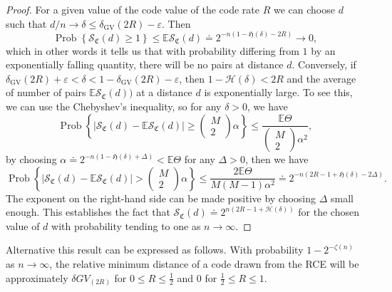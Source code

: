\begin{proof}
For a given value of the code value of the code rate $R$ we can choose $d$ such that $d/n\to\delta \leq \delta_{\mathrm{GV}}(2 R)-\varepsilon$. Then
\begin{equation}
\operatorname{Prob}\left\{\mathcal{S}_{\mathfrak{C}}(d) \geq 1\right\} \leq \mathbb{E} \mathcal{S}_{\mathfrak{C}}(d) \doteq 2^{-n(1-\mathfrak{H}(\delta)-2 R)} \rightarrow 0,
\end{equation}
which in other words it tells us that with probability differing from $1$ by an exponentially falling quantity, there will be no pairs at distance $d$. Conversely, if $\delta_{\mathrm{GV}}(2 R)+\varepsilon<\delta<1-\delta_{\mathrm{GV}}(2 R)-\varepsilon$, then $1-\mathcal{H}(\delta)<2R$ and the average of number of pairs $\mathbb{E} \mathcal{S}_{\mathfrak{C}}(d))$ at a distance $d$ is exponentially large. To see this, we can use the Chebyshev's inequality, so for any $\delta>0$, we have 
\begin{equation}
\operatorname{Prob}\left\{\left|\mathcal{S}_{\mathfrak{C}}(d)-\mathbb{E} \mathcal{S}_{\mathfrak{C}}(d)\right| \geq\left(\begin{array}{c}
M \\
2
\end{array}\right) \alpha\right\} \leq \frac{\mathbb{E} \Theta}{\left(\begin{array}{c}
M \\
2
\end{array}\right) \alpha^{2}},
\end{equation}
by choosing $\alpha \doteq 2^{-n(1-\mathfrak{H}(\delta)+\Delta)}<\mathbb{E} \Theta$ for any $\Delta>0$, then we have
\begin{equation}
\operatorname{Prob}\left\{\left|\mathcal{S}_{\mathfrak{C}}(d)-\mathbb{E}\mathcal{S}_{\mathfrak{C}}(d)\right|>\left(\begin{array}{c}
M \\
2
\end{array}\right) \alpha\right\}\leq \frac{2 \mathbb{E} \Theta}{M(M-1) \alpha^{2}} \doteq 2^{-n(2 R-1+\mathfrak{H}(\delta)-2 \Delta)}.
\label{CH2:probability_result}
\end{equation}
The exponent on the right-hand side can be made positive by choosing $\Delta$ small enough. This establishes the fact that $\mathcal{S}_{\mathfrak{C}}(d)\doteq 2^{n(2 R-1+\mathcal{H}(\delta))}$ for the chosen value of $d$ with probability tending to one as $n\to\infty$.
\end{proof}
Alternative this result can be expressed as follows. With probability $1-2^{-\zeta(n)}$ as $n\to \infty$, the relative minimum distance of a code drawn from the RCE will be approximately $\delta{GV}_(2R)$ for $0\leq R \leq \frac{1}{2}$ and $0$ for $\frac{1}{2}\leq R\leq 1$.\\
